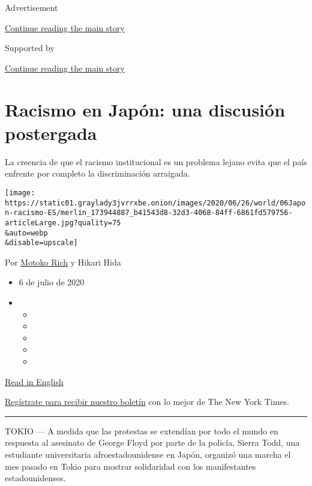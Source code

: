 Advertisement

\protect\hyperlink{after-top}{Continue reading the main story}

Supported by

\protect\hyperlink{after-sponsor}{Continue reading the main story}

\hypertarget{racismo-en-japuxf3n-una-discusiuxf3n-postergada}{%
\section{Racismo en Japón: una discusión
postergada}\label{racismo-en-japuxf3n-una-discusiuxf3n-postergada}}

La creencia de que el racismo institucional es un problema lejano evita
que el país enfrente por completo la discriminación arraigada.

\texttt{[image: https://static01.graylady3jvrrxbe.onion/images/2020/06/26/world/06Japon-racismo-ES/merlin\_173944887\_b41543d8-32d3-4068-84ff-6861fd579756-articleLarge.jpg?quality=75\\\&auto=webp\\\&disable=upscale]}

Por \href{https://www.nytimes3xbfgragh.onion/by/motoko-rich}{Motoko
Rich} y Hikari Hida

\begin{itemize}
\item
  6 de julio de 2020
\item
  \begin{itemize}
  \item
  \item
  \item
  \item
  \item
  \end{itemize}
\end{itemize}

\href{https://www.nytimes3xbfgragh.onion/2020/07/01/world/asia/japan-racism-black-lives-matter.html}{Read
in English}

\href{https://www.nytimes3xbfgragh.onion/newsletters/el-times}{Regístrate
para recibir nuestro boletín} con lo mejor de The New York Times.

\begin{center}\rule{0.5\linewidth}{\linethickness}\end{center}

TOKIO --- A medida que las protestas se extendían por todo el mundo en
respuesta al asesinato de George Floyd por parte de la policía, Sierra
Todd, una estudiante universitaria afroestadounidense en Japón, organizó
una marcha el mes pasado en Tokio para mostrar solidaridad con los
manifestantes estadounidenses.


